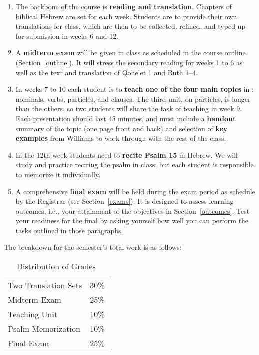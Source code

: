\documentclass[titlepage]{article}
\begin{document}
\begin{enumerate}

	\item The backbone of the course is \textbf{reading and
	translation}. Chapters of biblical Hebrew are set for each week.
	Students are to provide their own translations for class, which are
	then to be collected, refined, and typed up for submission in weeks
	6 and 12.

	\item A \textbf{midterm exam} will be given in class as scheduled in
	the course outline (Section~\ref{outline}). It will stress the
	secondary reading for weeks 1 to 6 \cite{holm} as well as the text
	and translation of Qohelet 1 and Ruth 1--4.

	\item In weeks 7 to 10 each student is to \textbf{teach one of the
	four main topics} in \cite{wms}: nominals, verbs, particles, and
	clauses. The third unit, on particles, is longer than the others, so
	two students will share the task of teaching in week 9. Each
	presentation should last 45 minutes, and must include a
	\textbf{handout} summary of the topic (one page front and back) and
	selection of \textbf{key examples} from Williams to work through
	with the rest of the class.

	\item In the 12th week students need to \textbf{recite Psalm 15} in
	Hebrew. We will study and practice reciting the psalm in class, but
	each student is responsible to memorize it individually.

	\item A comprehensive \textbf{final exam} will be held during the
	exam period as schedule by the Registrar (see Section~\ref{exams}).
	It is designed to assess learning outcomes, i.e., your attainment of
	the objectives in Section~\ref{outcomes}. Test your readiness for
	the final by asking yourself how well you can perform the tasks
	outlined in those paragraphs.

\end{enumerate}

The breakdown for the semester's total work is as follows:

\begin{table}[htbp]
  \centering
  {\lining
  \begin{tabular}{lr}
    \toprule
    Two Translation Sets & 30\% \\
    Midterm Exam         & 25\% \\
    Teaching Unit        & 10\% \\
    Psalm Memorization   & 10\% \\
    Final Exam           & 25\% \\
    \bottomrule
  \end{tabular}}
  \caption{Distribution of Grades}
  \label{distribution}
\end{table}
\end{document}
